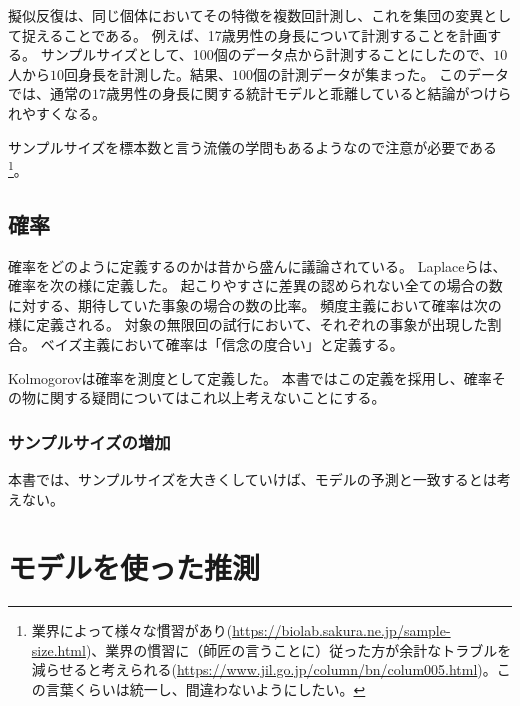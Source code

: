 擬似反復は、同じ個体においてその特徴を複数回計測し、これを集団の変異として捉えることである。
例えば、17歳男性の身長について計測することを計画する。
サンプルサイズとして、100個のデータ点から計測することにしたので、$10$人から$10$回身長を計測した。結果、$100$個の計測データが集まった。
このデータでは、通常の$17$歳男性の身長に関する統計モデルと乖離していると結論がつけられやすくなる。



サンプルサイズを標本数と言う流儀の学問もあるようなので注意が必要である
\footnote{業界によって様々な慣習があり(\url{https://biolab.sakura.ne.jp/sample-size.html})、業界の慣習に（師匠の言うことに）従った方が余計なトラブルを減らせると考えられる(\url{https://www.jil.go.jp/column/bn/colum005.html})。この言葉くらいは統一し、間違わないようにしたい。}。


\subsection{確率}
確率をどのように定義するのかは昔から盛んに議論されている。
Laplaceらは、確率を次の様に定義した。
起こりやすさに差異の認められない全ての場合の数に対する、期待していた事象の場合の数の比率。
頻度主義において確率は次の様に定義される。
対象の無限回の試行において、それぞれの事象が出現した割合。
ベイズ主義において確率は「信念の度合い」と定義する。

Kolmogorovは確率を測度として定義した。
本書ではこの定義を採用し、確率その物に関する疑問についてはこれ以上考えないことにする。

\subsubsection{サンプルサイズの増加}
本書では、サンプルサイズを大きくしていけば、モデルの予測と一致するとは考えない。


\section{モデルを使った推測}



